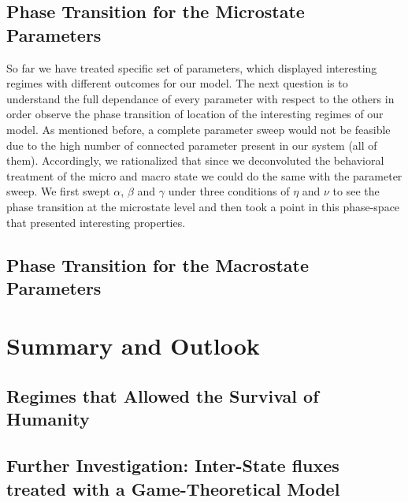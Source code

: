 \documentclass[11pt]{article} %
\begin{document}
\subsection{Phase Transition for the Microstate Parameters }\indent

So far we have treated specific set of parameters, which displayed interesting regimes with different outcomes for our model. The next question is to understand the full dependance of every parameter with respect to the others in order observe the phase transition of location of the interesting regimes of our model. As mentioned before, a complete parameter sweep would not be feasible due to the high number of connected parameter present in our system (all of them). Accordingly, we rationalized that since we deconvoluted the behavioral treatment of the micro and macro state we could do the same with the parameter sweep. We first swept $\alpha$, $\beta$ and $\gamma$ under three conditions of $\eta$ and $\nu$ to see the phase transition at the microstate level and then took a point in this phase-space that presented interesting properties. 







\subsection{Phase Transition for the Macrostate Parameters}\indent




\newpage
\section{Summary and Outlook}\indent

\subsection{Regimes that Allowed the Survival of Humanity}\indent


\subsection{Further Investigation: Inter-State fluxes treated with a Game-Theoretical Model}\indent
\label{sec:gt}
\end{document}
